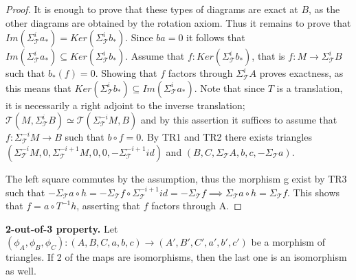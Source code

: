 \begin{proof}
        It is enough to prove that these types of diagrams are exact at $B$, as the other diagrams are obtained by the rotation axiom. Thus it remains to prove that $Im(\Sigma_{\mathcal{T}}^ia_*)=Ker(\Sigma_{\mathcal{T}}^ib_*)$. Since $ba=0$ it follows that $Im(\Sigma_{\mathcal{T}}^ia_*) \subseteq Ker(\Sigma_{\mathcal{T}}^ib_*)$. Assume that $f:Ker(\Sigma_{\mathcal{T}}^ib_*)$, that is $f:M\rightarrow \Sigma_{\mathcal{T}}^iB$ such that $b_*(f)=0$. Showing that $f$ factors through $\Sigma_{\mathcal{T}}^iA$ proves exactness, as this means that $Ker(\Sigma_{\mathcal{T}}^ib_*)\subseteq Im(\Sigma_{\mathcal{T}}^ia_*)$. Note that since $T$ is a translation, it is necessarily a right adjoint to the inverse translation; $\mathcal{T}(M,\Sigma_{\mathcal{T}}^iB) \simeq\mathcal{T}(\Sigma_{\mathcal{T}}^{-i}M,B)$ and by this assertion it suffices to assume that $f:\Sigma_{\mathcal{T}}^{-i}M\rightarrow B$ such that $b\circ f = 0$. By TR1 and TR2 there exists triangles $(\Sigma_{\mathcal{T}}^{-i}M,0,\Sigma_{\mathcal{T}}^{-i+1}M,0,0,-\Sigma_{\mathcal{T}}^{-i+1}id)$ and $(B,C,\Sigma_{\mathcal{T}}A,b,c,-\Sigma_{\mathcal{T}}a)$. 
        \begin{center}
        \end{center}
        The left square commutes by the assumption, thus the morphism g exist by TR3 such that $-\Sigma_{\mathcal{T}}a\circ h = -\Sigma_{\mathcal{T}}f\circ \Sigma_{\mathcal{T}}^{-i+1}id = -\Sigma_{\mathcal{T}}f \implies \Sigma_{\mathcal{T}}a\circ h = \Sigma_{\mathcal{T}}f$. This shows that $f = a\circ T^{-1}h$, asserting that $f$ factors through A.
    \end{proof}
    \begin{lemma}\textbf{2-out-of-3 property.}
        Let $(\phi_A, \phi_B, \phi_C):(A,B,C,a,b,c) \rightarrow (A',B',C',a',b',c')$ be a morphism of triangles. If 2 of the maps are isomorphisms, then the last one is an isomorphism as well.
        \begin{center}
        \end{center}
    \end{lemma}

